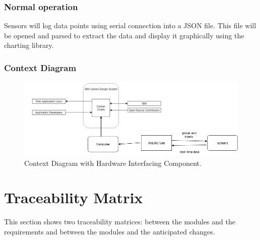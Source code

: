 \documentclass[12pt, titlepage]{article}
\begin{document}
\subsubsection{Normal operation}
Sensors will log data points using serial connection into a JSON file. This file will be opened and parsed to extract the data and display it graphically using the charting library. 

\subsubsection{Context Diagram}
\begin{figure}[h]
\centering
\includegraphics[width=1\textwidth]{contextDiagram.png}
\caption{Context Diagram with Hardware Interfacing Component.}
\label{FigUH}
\end{figure}

\newpage
\section{Traceability Matrix}
This section shows two traceability matrices: between the modules and the requirements and between the modules and the anticipated changes.
\end{document}
